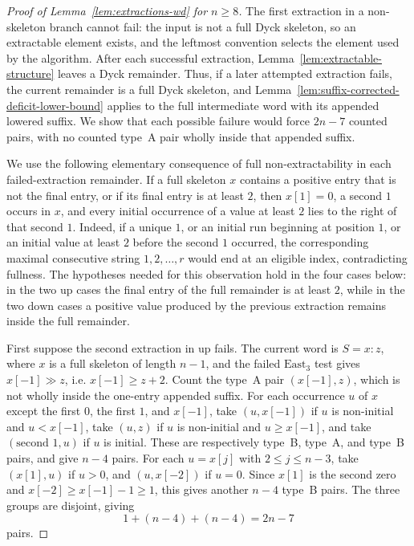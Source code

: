 \documentclass[11pt]{article}
\theoremstyle{plain}
\theoremstyle{definition}
\theoremstyle{remark}
\begin{document}
\begin{proof}[Proof of Lemma~\ref{lem:extractions-wd} for \(n\ge 8\)]
The first extraction in a non-skeleton branch cannot fail: the input is not a
full Dyck skeleton, so an extractable element exists, and the leftmost
convention selects the element used by the algorithm.  After each successful
extraction, Lemma~\ref{lem:extractable-structure} leaves a Dyck remainder.
Thus, if a later attempted extraction fails, the current remainder is a full
Dyck skeleton, and Lemma~\ref{lem:suffix-corrected-deficit-lower-bound} applies
to the full intermediate word with its appended lowered suffix.  We show that
each possible failure would force \(2n-7\) counted pairs, with no counted
type~A pair wholly inside that appended suffix.

We use the following elementary consequence of full non-extractability in each
failed-extraction remainder.  If a full skeleton \(x\) contains a positive
entry that is not the final entry, or if its final entry is at least \(2\),
then \(x[1]=0\), a second \(1\) occurs in \(x\), and every initial occurrence
of a value at least \(2\) lies to the right of that second \(1\).  Indeed, if a
unique \(1\), or an initial run beginning at position \(1\), or an initial
value at least \(2\) before the second \(1\) occurred, the corresponding
maximal consecutive string \(1,2,\ldots,r\) would end at an eligible index,
contradicting fullness.  The hypotheses needed for this observation hold in
the four cases below: in the two \(\mathrm{up}\) cases the final entry of the
full remainder is at least \(2\), while in the two \(\mathrm{down}\) cases a
positive value produced by the previous extraction remains inside the full
remainder.

First suppose the second extraction in \(\mathrm{up}\) fails.  The current
word is \(S=x:z\), where \(x\) is a full skeleton of length \(n-1\),
and the failed \(\mathrm{East}_3\) test gives \(x[-1]\gg z\), i.e.
\(x[-1]\ge z+2\).  Count the type~A pair \((x[-1],z)\), which is not wholly
inside the one-entry appended suffix.  For each
occurrence \(u\) of \(x\) except the first \(0\), the first \(1\), and
\(x[-1]\), take \((u,x[-1])\) if \(u\) is non-initial and \(u<x[-1]\), take
\((u,z)\) if \(u\) is non-initial and \(u\ge x[-1]\), and take
\((\text{second }1,u)\) if \(u\) is initial.  These are respectively type~B,
type~A, and type~B pairs, and give \(n-4\) pairs.  For each \(u=x[j]\) with
\(2\le j\le n-3\), take \((x[1],u)\) if \(u>0\), and \((u,x[-2])\) if
\(u=0\).  Since \(x[1]\) is the second zero and \(x[-2]\ge x[-1]-1\ge1\),
this gives another \(n-4\) type~B pairs.  The three groups are disjoint, giving
\[
  1+(n-4)+(n-4)=2n-7
\]
pairs.


\end{proof}
\end{document}
